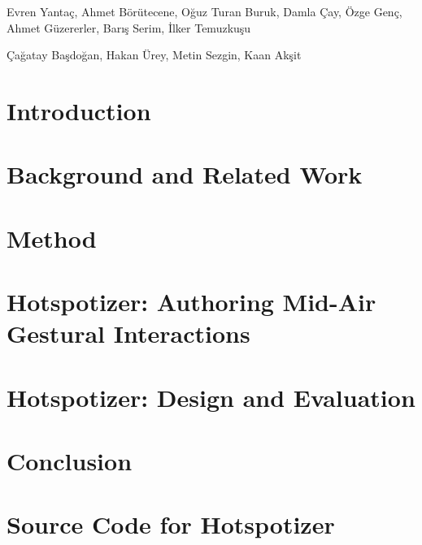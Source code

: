 \documentclass[10pt,twoside]{book}
\begin{document}
Evren Yantaç, Ahmet Börütecene, Oğuz Turan Buruk, Damla Çay, Özge Genç, Ahmet Güzererler, Barış Serim, İlker Temuzkuşu

Çağatay Başdoğan, Hakan Ürey, Metin Sezgin, Kaan Akşit

\tableofcontents

\chapter{Introduction}


\chapter{Background and Related Work}


\chapter{Method}


\chapter{Hotspotizer: Authoring Mid-Air Gestural Interactions}


\chapter{Hotspotizer: Design and Evaluation}


\chapter{Conclusion}


\appendix
\chapter{Source Code for Hotspotizer}

\end{document}
